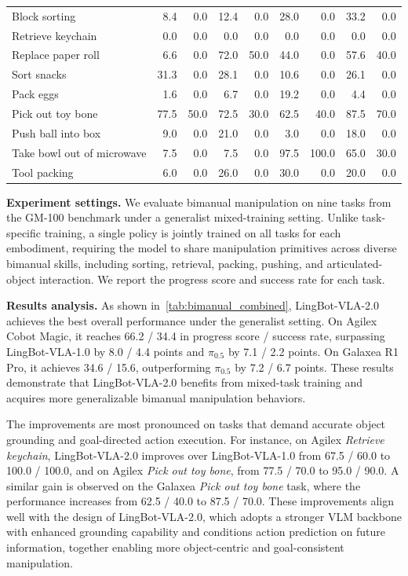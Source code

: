 \begin{table}[h]
\begin{tabular}{@{}lrrrrrrrr@{}}
Block sorting              
& 8.4 & 0.0 & 12.4 & 0.0 & 28.0 & 0.0 & 33.2 & 0.0 \\
Retrieve keychain          
& 0.0 & 0.0 & 0.0 & 0.0 & 0.0 & 0.0 & 0.0 & 0.0 \\
Replace paper roll         
& 6.6 & 0.0 & 72.0 & 50.0 & 44.0 & 0.0 & 57.6 & 40.0 \\
Sort snacks                
& 31.3 & 0.0 & 28.1 & 0.0 & 10.6 & 0.0 & 26.1 & 0.0 \\
Pack eggs                  
& 1.6 & 0.0 & 6.7 & 0.0 & 19.2 & 0.0 & 4.4 & 0.0 \\
Pick out toy bone          
& 77.5 & 50.0 & 72.5 & 30.0 & 62.5 & 40.0 & 87.5 & 70.0 \\
Push ball into box         
& 9.0 & 0.0 & 21.0 & 0.0 & 3.0 & 0.0 & 18.0 & 0.0 \\
Take bowl out of microwave 
& 7.5 & 0.0 & 7.5 & 0.0 & 97.5 & 100.0 & 65.0 & 30.0 \\
Tool packing               
& 6.0 & 0.0 & 26.0 & 0.0 & 30.0 & 0.0 & 20.0 & 0.0 \\

\bottomrule
\end{tabular}
\end{table}

\noindent\textbf{Experiment settings.}
We evaluate bimanual manipulation on nine tasks from the GM-100 benchmark under a generalist mixed-training setting. Unlike task-specific training, a single policy is jointly trained on all tasks for each embodiment, requiring the model to share manipulation primitives across diverse bimanual skills, including sorting, retrieval, packing, pushing, and articulated-object interaction. We report the progress score and success rate for each task.

\noindent\textbf{Results analysis.}
As shown in~\cref{tab:bimanual_combined}, LingBot-VLA-2.0 achieves the best overall performance under the generalist setting. On Agilex Cobot Magic, it reaches 66.2 / 34.4 in progress score / success rate, surpassing LingBot-VLA-1.0 by 8.0 / 4.4 points and $\pi_{0.5}$ by 7.1 / 2.2 points. On Galaxea R1 Pro, it achieves 34.6 / 15.6, outperforming $\pi_{0.5}$ by 7.2 / 6.7 points. These results demonstrate that LingBot-VLA-2.0 benefits from mixed-task training and acquires more generalizable bimanual manipulation behaviors.

The improvements are most pronounced on tasks that demand accurate object grounding and goal-directed action execution. For instance, on Agilex \textit{Retrieve keychain}, LingBot-VLA-2.0 improves over LingBot-VLA-1.0 from 67.5 / 60.0 to 100.0 / 100.0, and on Agilex \textit{Pick out toy bone}, from 77.5 / 70.0 to 95.0 / 90.0. A similar gain is observed on the Galaxea \textit{Pick out toy bone} task, where the performance increases from 62.5 / 40.0 to 87.5 / 70.0. These improvements align well with the design of LingBot-VLA-2.0, which adopts a stronger VLM backbone with enhanced grounding capability and conditions action prediction on future information, together enabling more object-centric and goal-consistent manipulation.

